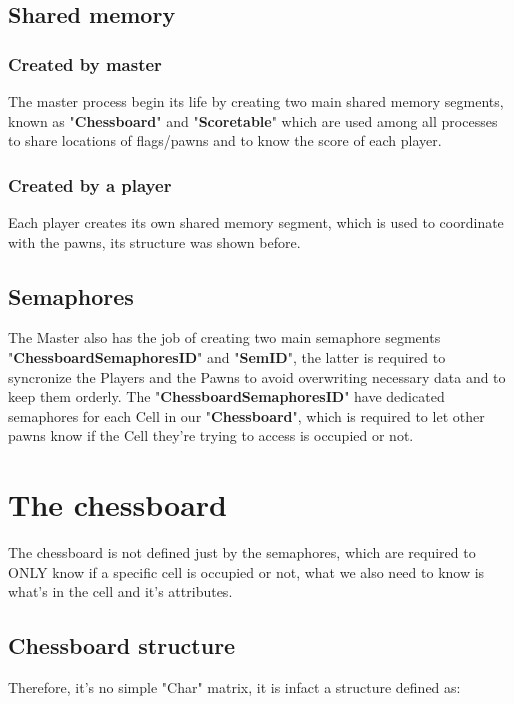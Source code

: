 \documentclass[11pt]{article}
\begin{document}
\subsection{Shared memory}

\subsubsection{Created by master}

The master process begin its life by creating two main shared memory segments, known as "\textbf{Chessboard}" and "\textbf{Scoretable}" which are used among all processes to share locations of flags/pawns and to know the score of each player.

\subsubsection{Created by a player}
Each player creates its own shared memory segment, which is used to coordinate with the pawns, its structure was shown before.

\subsection{Semaphores} The Master also has the job of creating two main semaphore segments "\textbf{ChessboardSemaphoresID}" and "\textbf{SemID}", the latter is required to syncronize the Players and the Pawns to avoid overwriting necessary data and to keep them orderly. The "\textbf{ChessboardSemaphoresID}" have dedicated semaphores for each Cell in our "\textbf{Chessboard}", which is required to let other pawns know if the Cell they're trying to access is occupied or not.



\section{The chessboard}

The chessboard is not defined just by the semaphores, which are required to ONLY know if a specific cell is occupied or not, what we also need to know is what's in the cell and it's attributes.

\subsection{Chessboard structure}

Therefore, it's no simple "Char" matrix, it is infact a structure defined as:
\end{document}
